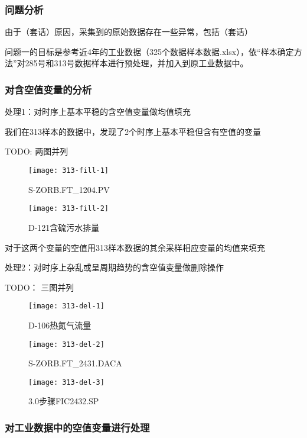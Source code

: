 \documentclass[bwprint]{gmcmthesis}
\begin{document}
\subsubsection{问题分析}

由于（套话）原因，采集到的原始数据存在一些异常，包括（套话）


问题一的目标是参考近4年的工业数据（325个数据样本数据.xlsx），依“样本确定方法”对285号和313号数据样本进行预处理，并加入到原工业数据中。



\subsubsection{对含空值变量的分析}

处理1：对时序上基本平稳的含空值变量做均值填充

我们在313样本的数据中，发现了2个时序上基本平稳但含有空值的变量

TODO: 两图并列

\begin{figure}[htbp]
	\centering
	\texttt{[image: 313-fill-1]}
	\caption{S-ZORB.FT\_1204.PV}
\end{figure}

\begin{figure}[htbp]
	\centering
	\texttt{[image: 313-fill-2]}
	\caption{D-121含硫污水排量}
\end{figure}

对于这两个变量的空值用313样本数据的其余采样相应变量的均值来填充

处理2：对时序上杂乱或呈周期趋势的含空值变量做删除操作

TODO： 三图并列

\begin{figure}[htbp]
	\centering
	\texttt{[image: 313-del-1]}
	\caption{D-106热氮气流量}
\end{figure}

\begin{figure}[htbp]
	\centering
	\texttt{[image: 313-del-2]}
	\caption{S-ZORB.FT\_2431.DACA}
\end{figure}

\begin{figure}[htbp]
	\centering
	\texttt{[image: 313-del-3]}
	\caption{3.0步骤FIC2432.SP}
\end{figure}



\subsubsection{对工业数据中的空值变量进行处理}
\end{document}

